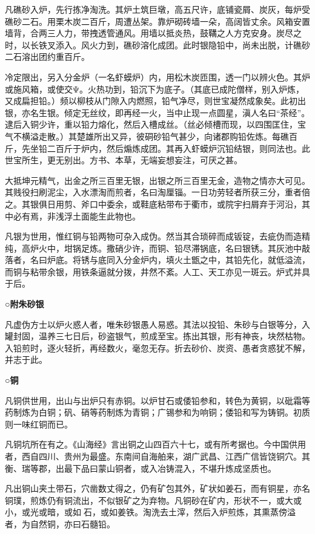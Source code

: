 \documentclass[]{article}
\begin{document}
凡礁砂入炉，先行拣净淘洗。其炉土筑巨墩，高五尺许，底铺瓷屑、炭灰，每炉受礁砂二石。用栗木炭二百斤，周遭丛架。靠炉砌砖墙一朵，高阔皆丈余。风箱安置墙背，合两三人力，带拽透管通风。用墙以抵炎热，鼓鞲之人方克安身。炭尽之时，以长铁叉添入。风火力到，礁砂溶化成团。此时银隐铅中，尚未出脱，计礁砂二石溶出团约重百斤。

冷定限出，另入分金炉（一名虾蟆炉）内，用松木炭匝围，透一门以辨火色。其炉或施风箱，或使交Ψ。火热功到，铅沉下为底子。（其底已成陀僧样，别入炉炼，又成扁担铅。）频以柳枝从门隙入内燃照，铅气净尽，则世宝凝然成象矣。此初出银，亦名生银。倾定无丝纹，即再经一火，当中止现一点圆星，滇人名曰``茶经''。逮后入铜少许，重以铅力熔化，然后入槽成丝。（丝必倾槽而现，以四围匡住，宝气不横溢走散。）其楚雄所出又异，彼硐砂铅气甚少，向诸郡购铅佐炼。每礁百斤，先坐铅二百斤于炉内，然后煽炼成团。其再入虾蟆炉沉铅结银，则同法也。此世宝所生，更无别出。方书、本草，无端妄想妄注，可厌之甚。

大抵坤元精气，出金之所三百里无银，出银之所三百里无金，造物之情亦大可见。其贱役扫刷泥尘，入水漂淘而煎者，名曰淘厘锱。一日功劳轻者所获三分，重者倍之。其银俱日用剪、斧口中委余，或鞋底粘带布于衢市，或院宇扫屑弃于河沿，其中必有焉，非浅浮土面能生此物也。

凡银为世用，惟红铜与铅两物可杂入成伪。然当其合琐碎而成钣锭，去疵伪而造精纯，高炉火中，坩锅足炼。撒硝少许，而铜、铅尽滞锅底，名曰银锈。其灰池中敲落者，名曰炉底。将锈与底同入分金炉内，填火土甑之中，其铅先化，就低溢流，而铜与粘带余银，用铁条逼就分拨，井然不紊。人工、天工亦见一斑云。炉式并具于后。

\textbf{○附朱砂银}

凡虚伪方士以炉火惑人者，唯朱砂银愚人易惑。其法以投铅、朱砂与白银等分，入罐封固，温养三七日后，砂盗银气，煎成至宝。拣出其银，形有神丧，块然枯物。入铅煎时，逐火轻折，再经数火，毫忽无存。折去砂价、炭资、愚者贪惑犹不解，并志于此。

\textbf{○铜}

凡铜供世用，出山与出炉只有赤铜。以炉甘石或倭铅参和，转色为黄铜，以砒霜等药制炼为白铜；矾、硝等药制炼为青铜；广锡参和为响铜；倭铅和写为铸铜。初质则一味红铜而已。

凡铜坑所在有之。《山海经》言出铜之山四百六十七，或有所考据也。今中国供用者，西自四川、贵州为最盛。东南间自海舶来，湖广武昌、江西广信皆饶铜穴。其衡、瑞等郡，出最下品曰蒙山铜者，或入冶铸混入，不堪升炼成坚质也。

凡出铜山夹土带石，穴凿数丈得之，仍有矿包其外，矿状如姜石，而有铜星，亦名铜璞，煎炼仍有铜流出，不似银矿之为弃物。凡铜砂在矿内，形状不一，或大或小，或光或暗，或如石，或如姜铁。淘洗去土滓，然后入炉煎炼，其熏蒸傍溢者，为自然铜，亦曰石髓铅。
\end{document}
